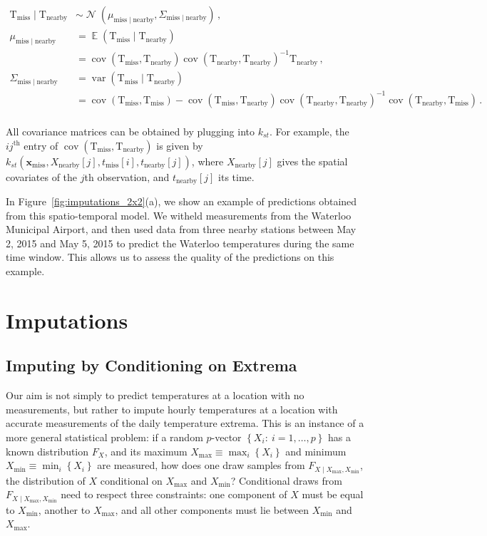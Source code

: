 \documentclass[letter]{article}
\newcommand{\genericdel}[3]{%
      \left#1#3\right#2
    }
\newcommand{\del}[1]{\genericdel(){#1}}
\newcommand{\sbr}[1]{\genericdel[]{#1}}
\newcommand{\cbr}[1]{\genericdel\{\}{#1}}
\DeclareMathOperator{\E}{\mathbb{E}}
\DeclareMathOperator{\cov}{{cov}}
\DeclareMathOperator{\var}{{var}}
\DeclareMathOperator{\normal}{\mathcal{N}}
\newcommand{\T}{\mathrm{T}}
\newcommand{\xvec}{\mathbold{x}}
\newcommand{\miss}{\mathrm{miss}}
\newcommand{\obs}{\mathrm{nearby}}
\newcommand{\Xmax}{X_{\max}}
\newcommand{\Xmin}{X_{\min}}
\newcommand{\Fcond}{F_{X \mid \Xmax,\Xmin}}
\newcommand{\eqlabel}[1]{\label{#1}}
\begin{document}
\begin{equation}
\begin{split}
    \T_\miss \mid \T_\obs &\sim \normal\del{\mu_{\miss \mid \obs}, \Sigma_{\miss \mid \obs}}\,, \\
    \mu_{\miss \mid \obs} &= \E \del{\T_\miss \mid \T_\obs} \\
        &= \cov\del{\T_\miss, \T_\obs} \cov\del{\T_\obs, \T_\obs}^{-1} \T_\obs\,, \\
    \Sigma_{\miss \mid \obs} &= \var \del{\T_\miss \mid \T_\obs} \\
        &= \cov\del{\T_\miss,\T_\miss} - \cov\del{\T_\miss, \T_\obs} \cov\del{\T_\obs, \T_\obs}^{-1} \cov\del{\T_\obs, \T_\miss}\,. \\ %
\end{split}
\eqlabel{eq:unconstrained_post}
\end{equation}

All covariance matrices can be obtained by plugging into \(k_{st}\). For example, the \(ij^{\text{th}}\) entry of \(\cov\del{\T_\miss, \T_\obs}\) is given by \(k_{st}(\xvec_\miss,X_\obs\sbr{j},t_\miss\sbr{i},t_\obs\sbr{j})\), where \(X_\obs\sbr{j}\) gives the spatial covariates of the \(j\)th observation, and \(t_\obs\sbr{j}\) its time.

In Figure~\ref{fig:imputations_2x2}(a), we show an example of predictions obtained from this spatio-temporal model. We witheld measurements from the Waterloo Municipal Airport, and then used data from three nearby stations between May 2, 2015 and May 5, 2015 to predict the Waterloo temperatures during the same time window. This allows us to assess the quality of the predictions on this example.
    


        \section{Imputations}\label{imputations}

\subsection{Imputing by Conditioning on Extrema}\label{imputing-by-conditioning-on-extrema}
    


        Our aim is not simply to predict temperatures at a location with no measurements, but rather to impute hourly temperatures at a location with accurate measurements of the daily temperature extrema.
This is an instance of a more general statistical problem: if a random \(p\)-vector \(\cbr{X_i:~i=1,\ldots,p}\) has a known distribution \(F_X\), and its maximum \(\Xmax \equiv \max_i\cbr{X_i}\) and minimum \(\Xmin \equiv \min_i\cbr{X_i}\) are measured, how does one draw samples from \(\Fcond\), the distribution of \(X\) conditional on \(\Xmax\) and \(\Xmin\)?
Conditional draws from \(\Fcond\) need to respect three constraints: one component of \(X\) must be equal to \(\Xmin\), another to \(\Xmax\), and all other components must lie between \(\Xmin\) and \(\Xmax\).
    
\end{document}
